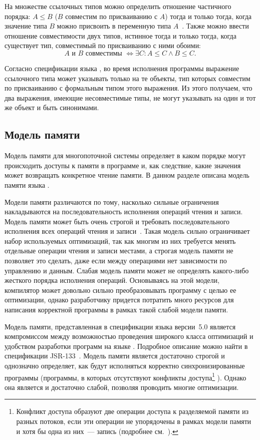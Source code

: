 \documentclass[14pt,titlepage,draft]{extarticle}
\newcommand{\java}{\eng{Java}\xspace}
\begin{document}
    На множестве ссылочных типов можно определить отношение частичного
    порядка: $A \leq B$ ($B$ совместим по присваиванию с $A$) тогда и только
    тогда, когда значение типа $B$ можно присвоить
    в переменную типа $A$~\cite{nastia_type_analysis}.
    Также можно ввести отношение совместимости двух типов, истинное тогда и
    только тогда, когда существует тип, совместимый по присваиванию с ними
    обоими:
    \[
      A \text{ и } B \text{ совместимы }
      \Leftrightarrow
      \exists C\colon A \leq C \land B \leq C.
    \]

    Согласно спецификации языка \java, во время исполнения программы
    выражение ссылочного типа может указывать только на те объекты, тип
    которых совместим по присваиванию с формальным типом этого выражения.
    Из этого получаем, что два выражения, имеющие несовместимые типы, не
    могут указывать на один и тот же объект и быть синонимами.

  \subsection{Модель памяти}

    Модель памяти для многопоточной системы определяет в каком
    порядке могут происходить доступы к памяти в программе и, как следствие,
    какие значения может возвращать конкретное чтение памяти. В данном разделе
    описана модель памяти языка \java.

    Модели памяти различаются по тому, насколько сильные ограничения
    накладываются на последовательность исполнения операций чтения и записи.
    Модель памяти может быть очень строгой и требовать последовательного
    исполнения всех операций чтения и записи~\cite{lamport}.
    Такая модель сильно ограничивает набор используемых оптимизаций, так как
    многим из них требуется менять отдельные операции чтения и записи местами,
    а строгая модель памяти не позволяет это сделать, даже если между
    операциями нет зависимости по управлению и данным.
    Слабая модель памяти может не определять какого-либо жесткого порядка
    исполнения операций. Основываясь на этой модели, компилятор может довольно
    сильно преобразовывать программу с целью ее оптимизации, однако
    разработчику придется потратить много ресурсов для написания корректной
    программы в рамках такой слабой модели памяти.

    Модель памяти, представленная в спецификации языка \java версии~5.0
    является компромиссом между возможностью проведения широкого класса
    оптимизаций и удобством разработки программ на языке \java. Подробное
    описание можно найти в спецификации JSR-133~\cite{jsr133}. Модель памяти
    является достаточно строгой и однозначно определяет, как будут исполняться
    корректно синхронизированные программы (программы, в которых отсутствуют
    конфликты доступа\footnote{
      Конфликт доступа  образуют две операции доступа к
      разделяемой памяти из разных потоков, если эти операции не упорядочены в
      рамках модели памяти и хотя бы одна из них~--- запись (подробнее
      см.~\cite[раздел~2.1]{manson_jmm}).
    } ). Однако она является и достаточно слабой,
    позволяя проводить многие оптимизации.
\end{document}
